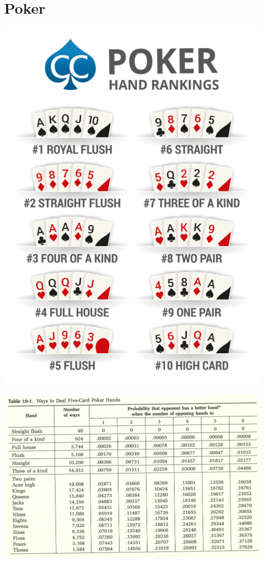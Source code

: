 \documentclass[9pt]{beamer}
\begin{document}
\section{Poker}%
\begin{frame}[fragile,t]
\begin{center}
	\includegraphics[scale=0.25]{figs/poker-hand-rankings-small.png}
\end{center}
\end{frame}
\begin{frame}[fragile,t]
\begin{center}
	\includegraphics[scale=0.25]{figs/Poker-1.png}
\end{center}
\end{frame}
\end{document}
